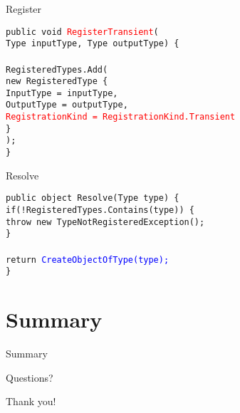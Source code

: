\documentclass{beamer}
\newcommand{\code}[1]{{\texttt{#1}}}
\begin{document}
\begin{frame}{Register}
     \begin{large}
	\code{public void \textcolor{red}{RegisterTransient}(}\\ \quad
	\code{Type inputType, Type outputType) \{}\\ \quad
		\code{}\\ \quad
		\code{RegisteredTypes.Add(}\\ \qquad
		\code{new RegisteredType \{}\\ \qquad \quad
 		\code{InputType = inputType,}\\ \qquad \quad
		\code{OutputType = outputType,}\\ \qquad \quad
		\code{\textcolor{red}{RegistrationKind = RegistrationKind.Transient}}\\ \qquad
		\code{\}}\\ \quad
		\code{);}\\
	\code{\}}
     \end{large}
\end{frame}

\begin{frame}{Resolve}
     \begin{large}
	\code{public object Resolve(Type type) \{}\\ \quad
		\code{if(!RegisteredTypes.Contains(type)) \{}\\ \qquad
		\code{throw new TypeNotRegisteredException();}\\ \quad
		\code{\}}\\ \quad
		\code{}\\ \quad
		\code{return \textcolor{blue}{CreateObjectOfType(type);}}\\
	\code{\}}
     \end{large}
\end{frame}

\section{Summary}

\begin{frame}{}
	\begin{center}
		\Huge{Summary}
	\end{center}
\end{frame}

\begin{frame}{Questions?}
	\begin{center}
		\Huge{Thank you!}
	\end{center}
\end{frame}
\end{document}
